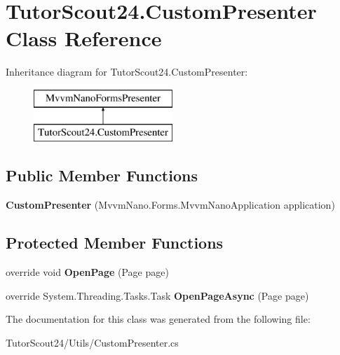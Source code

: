 \hypertarget{class_tutor_scout24_1_1_custom_presenter}{}\section{Tutor\+Scout24.\+Custom\+Presenter Class Reference}
\label{class_tutor_scout24_1_1_custom_presenter}
Inheritance diagram for Tutor\+Scout24.\+Custom\+Presenter\+:\begin{figure}[H]
\begin{center}
\leavevmode
\includegraphics[height=2.000000cm]{class_tutor_scout24_1_1_custom_presenter}
\end{center}
\end{figure}
\subsection*{Public Member Functions}
\begin{DoxyCompactItemize}
\item 
\mbox{\label{class_tutor_scout24_1_1_custom_presenter_a3cd89288c43587489c48acca8e285a85}} 
{\bfseries Custom\+Presenter} (Mvvm\+Nano.\+Forms.\+Mvvm\+Nano\+Application application)
\end{DoxyCompactItemize}
\subsection*{Protected Member Functions}
\begin{DoxyCompactItemize}
\item 
\mbox{\label{class_tutor_scout24_1_1_custom_presenter_a9776eb447b33c280cdf1314293cefb0a}} 
override void {\bfseries Open\+Page} (Page page)
\item 
\mbox{\label{class_tutor_scout24_1_1_custom_presenter_aeeb844c7d4afbb5ac12f1e0bb5013a53}} 
override System.\+Threading.\+Tasks.\+Task {\bfseries Open\+Page\+Async} (Page page)
\end{DoxyCompactItemize}


The documentation for this class was generated from the following file\+:\begin{DoxyCompactItemize}
\item 
Tutor\+Scout24/\+Utils/Custom\+Presenter.\+cs\end{DoxyCompactItemize}
